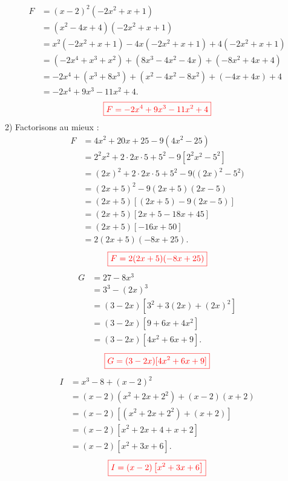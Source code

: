\documentclass[12pt,a4paper]{article}
\begin{document}
\begin{align*}
F &= (x - 2)^2(-2x^2 + x + 1) \\ 
  &= (x^2 - 4x + 4)(-2x^2 + x + 1) \\ 
  &= x^2(-2x^2 + x + 1) - 4x(-2x^2 + x + 1) + 4(-2x^2 + x + 1) \\ 
  &= \left(-2x^4 + x^3 + x^2\right) + \left(8x^3 - 4x^2 - 4x\right) + \left(-8x^2 + 4x + 4\right) \\ 
  &= -2x^4 + (x^3 + 8x^3) + (x^2 - 4x^2 - 8x^2) + (-4x + 4x) + 4 \\ 
  &= -2x^4 + 9x^3 - 11x^2 + 4.
\end{align*}
$$\textcolor{red}{\boxed{F=-2x^4 + 9x^3 - 11x^2 + 4}}$$
2) Factorisons au mieux :
\begin{align*}
F &= 4x^2 + 20x + 25 - 9(4x^2 - 25) \\ 
  &= 2^2x^2 + 2 \cdot 2x \cdot 5 + 5^2 - 9[2^2x^2 - 5^2] \\ 
  &= (2x)^2 + 2 \cdot 2x \cdot 5 + 5^2 - 9\big((2x)^2 - 5^2\big) \\ 
  &= (2x + 5)^2 - 9(2x + 5)(2x - 5) \\ 
  &= (2x + 5)\left[ (2x + 5) - 9(2x - 5)\right]  \\ 
  &= (2x + 5)\left[ 2x + 5 - 18x + 45\right]  \\ 
  &= (2x + 5)\left[ -16x + 50\right]  \\ 
  &= 2(2x + 5)(-8x + 25).
\end{align*}
$$\textcolor{red}{\boxed{F=2(2x + 5)(-8x + 25)}}$$
\begin{align*}
G &= 27 - 8x^3 \\ 
  &= 3^3 - (2x)^3 \\ 
  &= (3 - 2x)[3^2 + 3(2x) + (2x)^2] \\ 
  &= (3 - 2x)[9 + 6x + 4x^2] \\ 
  &= (3 - 2x)[4x^2 + 6x + 9].
\end{align*}
$$\textcolor{red}{\boxed{G=(3 - 2x)[4x^2 + 6x + 9]}}$$
\begin{align*}
I &= x^3 - 8 + (x - 2)^2 \\ 
  &= (x - 2)(x^2 + 2x + 2^2) + (x - 2)(x + 2) \\ 
  &= (x - 2)\left[(x^2 + 2x + 2^2) + (x + 2)\right] \\ 
  &= (x - 2)\left[x^2 + 2x + 4 + x + 2\right] \\ 
  &= (x - 2)\left[x^2 + 3x + 6\right].
\end{align*}
$$\textcolor{red}{\boxed{I=(x - 2)\left[x^2 + 3x + 6\right]}}$$
\end{document}
